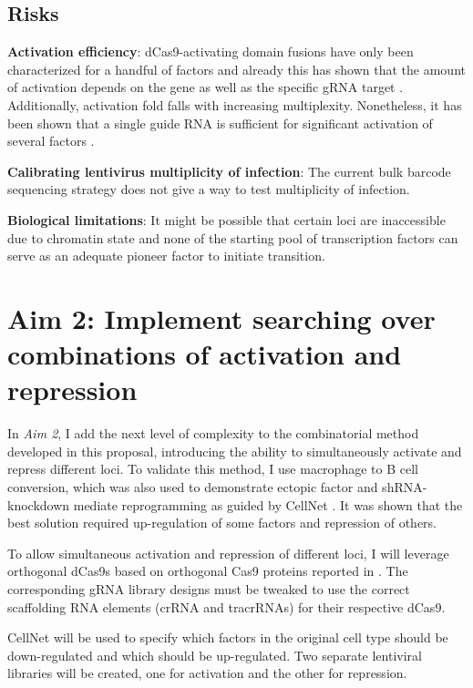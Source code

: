 \documentclass[10pt]{article}
\begin{document}
\subsection{Risks}

\textbf{Activation efficiency}: dCas9-activating domain fusions have only been characterized for a handful of factors and already this has shown that the amount of activation depends on the gene as well as the specific gRNA target \cite{chavez2015VPR, konermann2014genome}. Additionally, activation fold falls with increasing multiplexity. Nonetheless, it has been shown that a single guide RNA is sufficient for significant activation of several factors \cite{konermann2014genome}.
\newline

\noindent \textbf{Calibrating lentivirus multiplicity of infection}: The current bulk barcode sequencing strategy does not give a way to test multiplicity of infection.
\newline

\noindent \textbf{Biological limitations}: It might be possible that certain loci are inaccessible due to chromatin state and none of the starting pool of transcription factors can serve as an adequate pioneer factor to initiate transition.

\section{Aim 2: Implement searching over combinations of activation and repression}

In \textit{Aim 2}, I add the next level of complexity to the combinatorial method developed in this proposal, introducing the ability to simultaneously activate and repress different loci. To validate this method, I use macrophage to B cell conversion, which was also used to demonstrate ectopic factor and shRNA-knockdown mediate reprogramming as guided by CellNet \cite{morris2014dissecting}. It was shown that the best solution required up-regulation of some factors and repression of others.

To allow simultaneous activation and repression of different loci, I will leverage orthogonal dCas9s based on orthogonal Cas9 proteins reported in \cite{esvelt2013orthogonal}. The corresponding gRNA library designs must be tweaked to use the correct scaffolding RNA elements (crRNA and tracrRNAs) for their respective dCas9.

CellNet will be used to specify which factors in the original cell type should be down-regulated and which should be up-regulated. Two separate lentiviral libraries will be created, one for activation and the other for repression.
\end{document}
